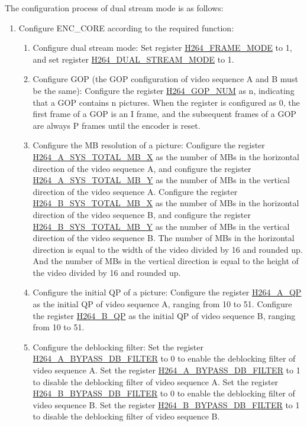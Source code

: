 \documentclass[main\_\_EN.tex]{subfiles}
\begin{document}
The configuration process of dual stream mode is as follows:
\begin{enumerate}
    \item\label{item:h264-dual-cfg} Configure ENC\_CORE according to the required function:
    \begin{enumerate}
        \item Configure dual stream mode: Set register \hyperref[fielddesc:H264FRAMEMODE]{H264\_FRAME\_MODE} to 1, and set register \hyperref[fielddesc:H264DUALSTREAMMODE]{H264\_DUAL\_STREAM\_MODE} to 1.
        \item Configure GOP (the GOP configuration of video sequence A and B must be the same): Configure the register \hyperref[fielddesc:H264GOPNUM]{H264\_GOP\_NUM} as n, indicating that a GOP contains n pictures. When the register is configured as 0, the first frame of a GOP is an I frame, and the subsequent frames of a GOP are always P frames until the encoder is reset.
        \item Configure the MB resolution of a picture: Configure the register \hyperref[fielddesc:H264ASYSTOTALMBX]{H264\_A\_SYS\_TOTAL\_MB\_X} as the number of MBs in the horizontal direction of the video sequence A, and configure the register \hyperref[fielddesc:H264ASYSTOTALMBY]{H264\_A\_SYS\_TOTAL\_MB\_Y} as the number of MBs in the vertical direction of the video sequence A. Configure the register \hyperref[fielddesc:H264BSYSTOTALMBX]{H264\_B\_SYS\_TOTAL\_MB\_X} as the number of MBs in the horizontal direction of the video sequence B, and configure the register \hyperref[fielddesc:H264BSYSTOTALMBY]{H264\_B\_SYS\_TOTAL\_MB\_Y} as the number of MBs in the vertical direction of the video sequence B. The number of MBs in the horizontal direction is equal to the width of the video divided by 16 and rounded up. And the number of MBs in the vertical direction is equal to the height of the video divided by 16 and rounded up.
        \item Configure the initial QP of a picture: Configure the register \hyperref[fielddesc:H264AQP]{H264\_A\_QP} as the initial QP of video sequence A, ranging from 10 to 51. Configure the register \hyperref[fielddesc:H264BQP]{H264\_B\_QP} as the initial QP of video sequence B, ranging from 10 to 51.
        \item Configure the deblocking filter: Set the register \hyperref[fielddesc:H264ABYPASSDBFILTER]{H264\_A\_BYPASS\_DB\_FILTER} to 0 to enable the deblocking filter of video sequence A. Set the register \hyperref[fielddesc:H264ABYPASSDBFILTER]{H264\_A\_BYPASS\_DB\_FILTER} to 1 to disable the deblocking filter of video sequence A. Set the register \hyperref[fielddesc:H264BBYPASSDBFILTER]{H264\_B\_BYPASS\_DB\_FILTER} to 0 to enable the deblocking filter of video sequence B. Set the register \hyperref[fielddesc:H264BBYPASSDBFILTER]{H264\_B\_BYPASS\_DB\_FILTER} to 1 to disable the deblocking filter of video sequence B.

\end{enumerate}
\end{enumerate}
\end{document}
